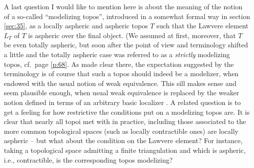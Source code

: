A last question I would like to mention here is about the meaning of
the notion of a so-called ``modelizing topos'', introduced in a
somewhat formal way in section \ref{sec:35}, as a locally aspheric and
aspheric topos $T$ such that the Lawvere element $L_T$ of $T$ is
aspheric over the final object. (We assumed at first, moreover, that
$T$ be even totally aspheric, but soon after the point of view and
terminology shifted a little and the totally aspheric case was
referred to as a \emph{strictly} modelizing topos, cf.\ page
\ref{p:68}. As made clear there, the expectation suggested by the
terminology is of course that such a topos should indeed be a
modelizer, when endowed with the usual notion of weak
equivalence. This sill makes sense and seem plausible enough, when
usual weak equivalence is replaced by the weaker notion defined in
terms of an arbitrary basic localizer \scrW. A related question is to
get a feeling for how restrictive the conditions put on a modelizing
topos are. It is clear that nearly all topoi met with in practice,
including those associated to the more common topological spaces (such
as locally contractible ones) are locally aspheric -- but what about
the condition on the Lawvere element? For instance, taking a
topological space admitting a finite triangulation and which is
aspheric, i.e., contractible, is the corresponding topos modelizing?

\bigbreak

\noindent\hfill{}\par

